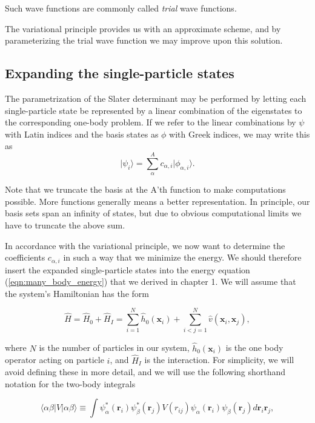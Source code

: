 Such wave functions are commonly called \emph{trial} wave functions. 

The variational principle provides us with an approximate scheme, and
by parameterizing the trial wave function we may improve upon this
solution.

\subsection{Expanding the single-particle states}

The parametrization of the Slater determinant may be performed by letting
each single-particle state be represented by a linear combination of
the eigenstates to the corresponding one-body problem. If we refer to
the linear combinations by $\psi$ with Latin indices and the basis
states as $\phi$ with Greek indices, we may write this as
\begin{equation}
\vert \psi_i \rangle = \sum_\alpha^A c_{\alpha,i} \vert \phi_{\alpha,i} \rangle .
\label{eqn:expanding_sp_states}
\end{equation}

Note that we truncate the basis at the A'th function to make
computations possible. More functions generally means a better
representation. In principle, our basis sets span an infinity of states, but due to obvious computational limits we have to truncate the above sum.

In accordance with the variational principle, we now want to determine
the coefficients $c_{\alpha, i}$ in such a way that we minimize the
energy. We should therefore insert the expanded single-particle states
into the energy equation (\ref{eqn:many_body_energy}) that we derived
in chapter 1. We will assume that the system's Hamiltonian has the form

\begin{equation}
\hat{H} = \hat{H}_0 + \hat{H}_I = \sum_{i=1}^N \hat{h}_0(\mathbf{x}_i) + \sum_{i<j=1}^N \hat{v}(\mathbf{x}_i,\mathbf{x}_j),
\end{equation}

where $N$ is the number of particles in our system,  $\hat{h}_0(\mathbf{x}_i)$ is the one body operator acting on particle $i$, and $\hat{H}_I$ is the interaction. For simplicity, we will avoid defining these in more detail, and we will use the following shorthand notation for the two-body integrals

\begin{equation}
\langle \alpha \beta \vert V \vert \alpha \beta \rangle \equiv \int \psi_\alpha^*(\mathbf{r}_i) \psi_\beta^*(\mathbf{r}_j) V(r_{ij})  \psi_\alpha(\mathbf{r}_i) \psi_\beta(\mathbf{r}_j) d\mathbf{r}_i\mathbf{r}_j,
\end{equation}

